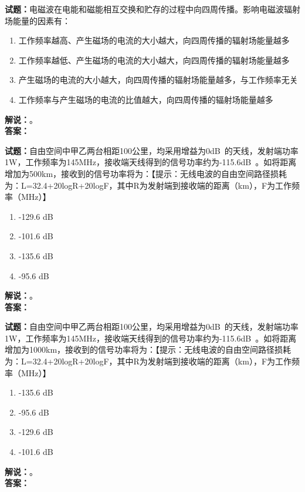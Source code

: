 \documentclass{ctexbook}
\begin{document}
\noindent\textbf{试题：}电磁波在电能和磁能相互交换和贮存的过程中向四周传播。影响电磁波辐射场能量的因素有：
\begin{enumerate}[leftmargin=3em]
\item 工作频率越高、产生磁场的电流的大小越大，向四周传播的辐射场能量越多
\item 工作频率越低、产生磁场的电流的大小越大，向四周传播的辐射场能量越多
\item 产生磁场的电流的大小越大，向四周传播的辐射场能量越多，与工作频率无关
\item 工作频率与产生磁场的电流的比值越大，向四周传播的辐射场能量越多
\end{enumerate}
\noindent\textbf{解说：}\textbf{}。\\\noindent\textbf{答案：}

\bigskip




\noindent\textbf{试题：}自由空间中甲乙两台相距100公里，均采用增益为0\unit[qualifier-mode=combine]{\deci\bel{}}的天线，发射端功率1W，工作频率为145\unit{\MHz}，接收端天线得到的信号功率约为-115.6\unit[qualifier-mode=combine]{\deci\bel{}}。如将距离增加为500km，接收到的信号功率将为：【提示：无线电波的自由空间路径损耗为：L=32.4+20logR+20logF，其中R为发射端到接收端的距离（km），F为工作频率（\unit{\MHz}）】
\begin{enumerate}[leftmargin=3em]
\item -129.6 \unit[qualifier-mode=combine]{\deci\bel{}}
\item -101.6 \unit[qualifier-mode=combine]{\deci\bel{}}
\item -135.6 \unit[qualifier-mode=combine]{\deci\bel{}}
\item -95.6 \unit[qualifier-mode=combine]{\deci\bel{}}
\end{enumerate}
\noindent\textbf{解说：}\textbf{}。\\\noindent\textbf{答案：}

\bigskip




\noindent\textbf{试题：}自由空间中甲乙两台相距100公里，均采用增益为0\unit[qualifier-mode=combine]{\deci\bel{}}的天线，发射端功率1W，工作频率为145\unit{\MHz}，接收端天线得到的信号功率约为-115.6\unit[qualifier-mode=combine]{\deci\bel{}}。如将距离增加为1000km，接收到的信号功率将为：【提示：无线电波的自由空间路径损耗为：L=32.4+20logR+20logF，其中R为发射端到接收端的距离（km），F为工作频率（\unit{\MHz}）】
\begin{enumerate}[leftmargin=3em]
\item -135.6 \unit[qualifier-mode=combine]{\deci\bel{}}
\item -95.6 \unit[qualifier-mode=combine]{\deci\bel{}}
\item -129.6 \unit[qualifier-mode=combine]{\deci\bel{}}
\item -101.6 \unit[qualifier-mode=combine]{\deci\bel{}}
\end{enumerate}
\noindent\textbf{解说：}\textbf{}。\\\noindent\textbf{答案：}
\end{document}
